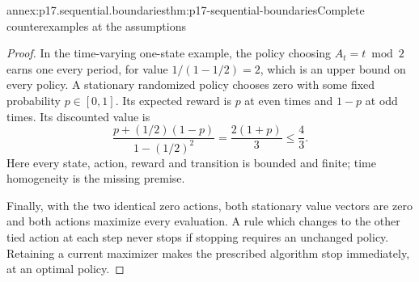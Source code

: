 \begin{annexitem}{annex:p17.sequential.boundaries}{thm:p17-sequential-boundaries}{Complete counterexamples at the assumptions}
\begin{proof}
In the time-varying one-state example,
the policy choosing \(A_t=t\bmod2\)
earns one every period, for value
\(1/(1-1/2)=2\), which is an upper
bound on every policy. A stationary
randomized policy chooses zero with
some fixed probability \(p\in[0,1]\).
Its expected reward is \(p\) at even
times and \(1-p\) at odd times. Its
discounted value is
\[
             \frac{p+(1/2)(1-p)}{1-(1/2)^2}
                    =\frac{2(1+p)}3\leq\frac43.
\]
Here every state, action, reward and
transition is bounded and finite;
time homogeneity is the missing premise.

Finally, with the two identical zero
actions, both stationary value vectors
are zero and both actions maximize
every evaluation. A rule which changes
to the other tied action at each step
never stops if stopping requires an
unchanged policy. Retaining a current
maximizer makes the prescribed algorithm
stop immediately, at an optimal policy.
\end{proof}
\end{annexitem}

